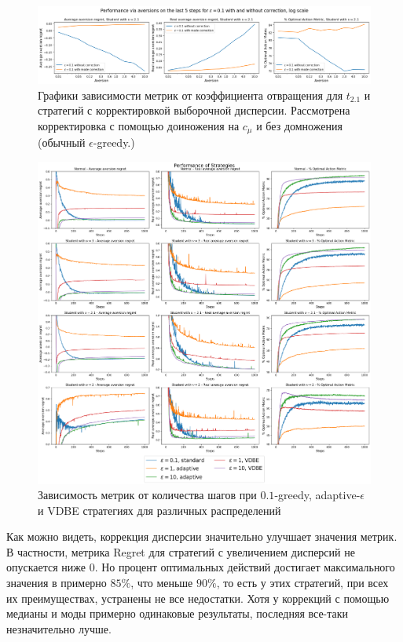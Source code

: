 \documentclass{article}
\begin{document}
\begin{figure}[h] %
\centering
\includegraphics[width=6in]{theory_tester/theory_images/correction_variance/aversions_last_5_steps.png}
\caption{Графики зависимости метрик от коэффициента отвращения для $t_{2.1}$ и стратегий с корректировкой выборочной дисперсии. Рассмотрена корректировка с помощью доиножения на $c_{\mu}$ и без домножения (обычный $\epsilon$-greedy.)}
\label{fig:correction_aversion_strat_distr}
\end{figure}

\begin{figure}[h] %
\centering
\includegraphics[width=6in]{theory_tester/theory_images/adaptive_epsilon/one_distr.png}
\caption{Зависимость метрик от количества шагов при $0.1$-greedy, adaptive-$\epsilon$ и VDBE стратегиях для различных распределений}
\label{fig:adaptive_eps_strat_distr}
\end{figure}

Как можно видеть, коррекция дисперсии значительно улучшает значения метрик. В частности, метрика Regret для стратегий с увеличением дисперсий не опускается ниже 0. Но процент оптимальных действий достигает максимального значения в примерно $85\%$, что меньше $90\%$, то есть у этих стратегий, при всех их преимуществах, устранены не все недостатки. Хотя у коррекций с помощью медианы и моды примерно одинаковые результаты, последняя все-таки незначительно лучше.
\end{document}
